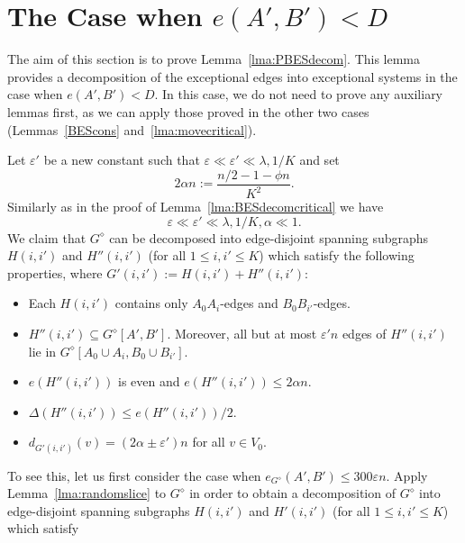 \documentclass{memo-l}
\def\eps{\varepsilon}
\numberwithin{section}{chapter}
\numberwithin{equation}{section}
\numberwithin{firstthm}{section}
\numberwithin{figure}{section}
\begin{document}
{%


\section{The Case when $e(A',B') < D$}\label{1factsec}

The aim of this section is to prove Lemma~\ref{lma:PBESdecom}. This lemma provides a decomposition of the exceptional edges into exceptional systems in the  case when $e(A',B') < D$.
In this case, we do not need to prove any auxiliary lemmas first, as we can apply those proved in the other two cases
(Lemmas~\ref{BEScons} and~\ref{lma:movecritical}).

\removelastskip{}\medskip{}
Let $\eps'$ be a new constant such that $\eps \ll \eps' \ll \lambda, 1/K$ and
set 
\begin{equation} \label{alphaD}
2\alpha n:= \frac{n/2 - 1 - \phi n }{K^2}.
\end{equation}
Similarly as in the proof of Lemma~\ref{lma:BESdecomcritical} we have
\begin{equation}\label{alphahier4}
\eps \ll \eps'  \ll \lambda, 1/K, \alpha \ll 1.
\end{equation}
We claim that $G^{\diamond}$ can be decomposed into edge-disjoint spanning subgraphs $H(i,i')$ and $H''(i,i')$ (for all $1\le i,i' \le K$)
which satisfy the following properties, where $G'(i,i'):=H(i,i')+H''(i,i')$:
\begin{itemize}
\item[\rm (b$_1'$)] Each $H(i,i')$ contains only $A_0A_i$-edges and $B_0B_{i'}$-edges.
 \item[\rm (b$_2'$)] $H''(i,i')\subseteq G^{\diamond}[A',B']$.
Moreover, all but at most  $\eps' n$ edges of $H''(i,i')$ lie in $G^{\diamond}[A_0 \cup A_i, B_0 \cup B_{i'}]$.
\item[\rm (b$_3'$)] $e ( H''(i,i') )$ is even and $e(H''(i,i')) \le 2 \alpha n $.
\item[\rm (b$_4'$)] $\Delta(H''(i,i')) \le e ( H''(i,i') )/2$.
\item[\rm  (b$_5'$)] $d_{G'(i,i')}(v )  =  (2\alpha   \pm  \eps' )n$ for all $v\in V_0$.
\end{itemize}
To see this, let us first consider the case when $ e_{G^{\diamond}}(A',B') \le 300 \eps n $.
Apply Lemma~\ref{lma:randomslice} to $G^{\diamond}$ in order to obtain a decomposition
of $G^{\diamond}$ into edge-disjoint spanning subgraphs $H(i,i')$ and $H'(i,i')$ (for all $1\le i,i' \le K$) which satisfy
}
\end{document}
